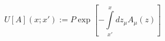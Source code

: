 \begin{equation}
  \label{eq:defU}
U[A](x;x') := P \exp\left[ - \int\limits_{x'}^x \!\! dz_\mu A_\mu(z) \right]
\end{equation}

